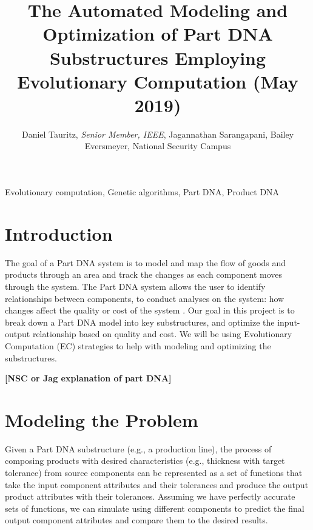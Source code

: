 \documentclass{IEEEtran}
\begin{document}
\title{The Automated Modeling and Optimization of Part DNA Substructures Employing Evolutionary Computation (May 2019)}
\author{Daniel Tauritz, \textit{Senior Member, IEEE}, Jagannathan Sarangapani, Bailey Eversmeyer, National Security Campus}

\maketitle

\begin{abstract}

\end{abstract}

\begin{IEEEkeywords}
Evolutionary computation, Genetic algorithms, Part DNA, Product DNA
\end{IEEEkeywords}

\section{Introduction}
The goal of a Part DNA system is to model and map the flow of goods and products through an area and track the changes as each component moves through the system. The Part DNA system allows the user to identify relationships between components, to conduct analyses on the system: how changes affect the quality or cost of the system \cite{b1}. Our goal in this project is to break down a Part DNA model into key substructures, and optimize the input-output relationship based on quality and cost. We will be using Evolutionary Computation (EC) strategies to help with modeling and optimizing the substructures.

\textbf{[NSC or Jag explanation of part DNA]}

\section{Modeling the Problem}
Given a Part DNA substructure (e.g., a production line), the process of composing products with desired characteristics (e.g., thickness with target tolerance) from source components can be represented as a set of functions that take the input component attributes and their tolerances and produce the output product attributes with their tolerances. Assuming we have perfectly accurate sets of functions, we can simulate using different components to predict the final output component attributes and compare them to the desired results.
\end{document}
